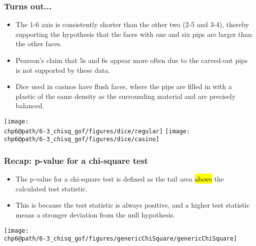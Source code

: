 \documentclass[slidestop,compress,mathserif]{beamer}
\makeatletter
\def\chp6@path{../../Chp 6}
\makeatother
\begin{document}
\begin{frame}
\frametitle{Turns out...}

\begin{itemize}

\item The 1-6 axis is consistently shorter than the other two (2-5 and 3-4), thereby supporting the hypothesis that the faces with one and six pips are larger than the other faces.

\item Pearson's claim that 5s and 6s appear more often due to the carved-out pips is not supported by these data.

\item Dice used in casinos have flush faces, where the pips are filled in with a plastic of the same density as the surrounding material and are precisely balanced.

\end{itemize}

\begin{center}
\texttt{[image: \\chp6@path/6-3\_chisq\_gof/figures/dice/regular]}
\texttt{[image: \\chp6@path/6-3\_chisq\_gof/figures/dice/casino]}
\end{center}


\end{frame}


\begin{frame}
\frametitle{Recap: p-value for a chi-square test}

\begin{itemize}

\item The p-value for a chi-square test is defined as the tail area \hl{above} the calculated test statistic.

\item This is because the test statistic is always positive, and a higher test statistic means a stronger deviation from the null hypothesis.

\end{itemize}

\begin{center}
\texttt{[image: \\chp6@path/6-3\_chisq\_gof/figures/genericChiSquare/genericChiSquare]}
\end{center}

\end{frame}
\end{document}
